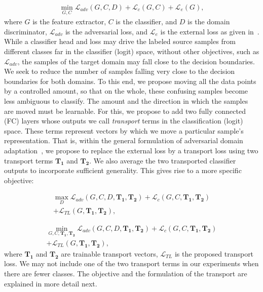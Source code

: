 \documentclass[10pt,twocolumn,letterpaper]{article}
\begin{document}
\begin{equation}
\begin{aligned}
    \min_{G,C} \mathcal{L}_{adv}(G, C, D) + \mathcal{L}_c(G,C) + \mathcal{L}_e(G), 
\end{aligned}
\end{equation}
where $G$ is the feature extractor, $C$ is the classifier, and $D$ is the domain discriminator, $\mathcal{L}_{adv}$ is the adversarial loss, and $\mathcal{L}_e$ is the external loss as given in~\cite{adda}. While a classifier head and loss may drive the labeled source samples from different classes far in the classifier (logit) space, without other objectives, such as $\mathcal{L}_{adv}$, the samples of the target domain may fall close to the decision boundaries. We seek to reduce the number of samples falling very close to the decision boundaries for both domains. To this end, we propose moving all the data points by a controlled amount, so that on the whole, these confusing samples become less ambiguous to classify. The amount and the direction in which the samples are moved must be learnable. For this, we propose to add two fully connected (FC) layers whose outputs we call \emph{transport} terms in the classification (logit) space. These terms represent vectors by which we move a particular sample's representation. That is, within the general formulation of adversarial domain adaptation~\cite{adda}, we propose to replace the external loss by a transport loss using two transport terms $\mathbf{T_1}$ and $\mathbf{T_2}$. We also average the two transported classifier outputs to incorporate sufficient generality. This gives rise to a more specific objective:


\begin{equation}
\begin{aligned}
    \max_D \mathcal{L}_{adv}(G, C, D, \mathbf{T_1}, \mathbf{T_2}) + \mathcal{L}_c(G,C, \mathbf{T_1}, \mathbf{T_2}) \\ + \mathcal{L}_{TL}(G, \mathbf{T_1}, \mathbf{T_2}),
\end{aligned}
\end{equation}

\begin{equation}
\begin{aligned}
    \min_{G,C,\mathbf{T_1}, \mathbf{T_2}} \mathcal{L}_{adv}(G, C, D, \mathbf{T_1}, \mathbf{T_2}) + \mathcal{L}_c(G,C, \mathbf{T_1}, \mathbf{T_2}) \\ + \mathcal{L}_{TL}(G, \mathbf{T_1}, \mathbf{T_2}), 
\end{aligned}
\end{equation}
where $\mathbf{T_1}$ and $\mathbf{T_2}$ are trainable transport vectors, $\mathcal{L}_{TL}$ is the proposed transport loss. We may not include one of the two transport terms in our experiments when there are fewer classes. The objective and the formulation of the transport are explained in more detail next. 
\end{document}
